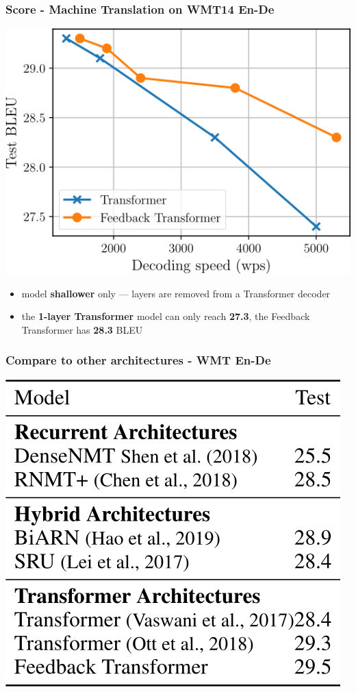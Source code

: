 \documentclass{beamer}
\begin{document}
\begin{frame}
    \frametitle{Score - Machine Translation on WMT14 En-De}
    \begin{center}
        \includegraphics[scale=0.3]{img/feedback_transformer_wmt_decoding.png}
    \end{center}
    \begin{itemize}
        \item model \textbf{shallower} only — layers are removed from a Transformer decoder
        \item the \textbf{1-layer Transformer} model can only reach \textbf{27.3}, the Feedback Transformer has \textbf{28.3} BLEU
    \end{itemize}
\end{frame}

\begin{frame}
    \frametitle{Compare to other architectures - WMT En-De}
    \begin{center}
        \includegraphics[scale=0.3]{img/feedback_transformer_compare_architectures.png}
    \end{center}
\end{frame}
\end{document}
